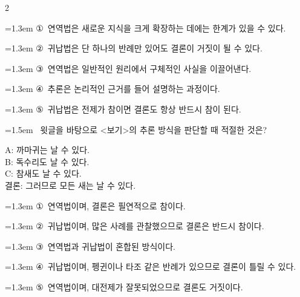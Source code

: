 \documentclass[10pt, a4paper]{article}
\begin{document}
\begin{multicols}{2}
\begin{minipage}{\columnwidth}
\vspace{0.5mm}
{\hangindent=1.3em  \noindent\hspace{0.3em}①~연역법은 새로운 지식을 크게 확장하는 데에는 한계가 있을 수 있다.\par}
{\hangindent=1.3em  \noindent\hspace{0.3em}②~귀납법은 단 하나의 반례만 있어도 결론이 거짓이 될 수 있다.\par}
{\hangindent=1.3em  \noindent\hspace{0.3em}③~연역법은 일반적인 원리에서 구체적인 사실을 이끌어낸다.\par}
{\hangindent=1.3em  \noindent\hspace{0.3em}④~추론은 논리적인 근거를 들어 설명하는 과정이다.\par}
{\hangindent=1.3em  \noindent\hspace{0.3em}⑤~귀납법은 전제가 참이면 결론도 항상 반드시 참이 된다.\par}
\vspace{4mm}
\end{minipage}
\par

\noindent\begin{minipage}{\columnwidth}
\vspace{2mm}
{\hangindent=1.5em  ~윗글을 바탕으로 <보기>의 추론 방식을 판단할 때 적절한 것은?\par}

\vspace{1mm}
\begin{boxibox}
A: 까마귀는 날 수 있다. \\
B: 독수리도 날 수 있다. \\
C: 참새도 날 수 있다. \\
결론: 그러므로 모든 새는 날 수 있다. \\
\end{boxibox}
\vspace{1mm}

\vspace{0.5mm}
{\hangindent=1.3em  \noindent\hspace{0.3em}①~연역법이며, 결론은 필연적으로 참이다.\par}
{\hangindent=1.3em  \noindent\hspace{0.3em}②~귀납법이며, 많은 사례를 관찰했으므로 결론은 반드시 참이다.\par}
{\hangindent=1.3em  \noindent\hspace{0.3em}③~연역법과 귀납법이 혼합된 방식이다.\par}
{\hangindent=1.3em  \noindent\hspace{0.3em}④~귀납법이며, 펭귄이나 타조 같은 반례가 있으므로 결론이 틀릴 수 있다.\par}
{\hangindent=1.3em  \noindent\hspace{0.3em}⑤~연역법이며, 대전제가 잘못되었으므로 결론도 거짓이다.\par}
\vspace{4mm}
\end{minipage}
\par


\end{multicols}
\end{document}
